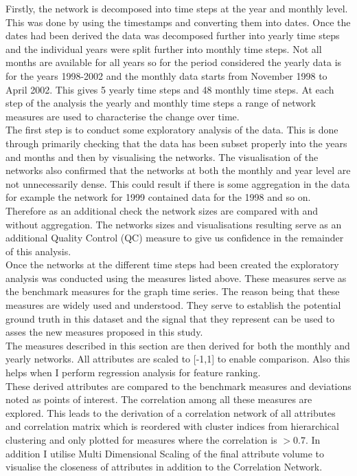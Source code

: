 Firstly, the network is decomposed into time steps at the year and monthly level. This was done by using the timestamps and converting them into dates. Once the dates had been derived the data was decomposed further into yearly time steps and the individual years were split further into monthly time steps. Not all months are available for all years so for the period considered the yearly data is for the years 1998-2002 and the monthly data starts from November 1998 to April 2002. This gives 5 yearly time steps and 48 monthly time steps. At each step of the analysis the yearly and monthly time steps a range of network measures are used to characterise the change over time. \\

The first step is to conduct some exploratory analysis of the data. This is done through primarily checking that the data has been subset properly into the years and months and then by visualising the networks. The visualisation of the networks also confirmed that the networks at both the monthly and year level are not unnecessarily dense. This could result if there is some aggregation in the data for example the network for 1999 contained data for the 1998 and so on. Therefore as an additional check the network sizes are compared with and without aggregation. The networks sizes and visualisations resulting serve as an additional Quality Control (QC) measure to give us confidence in the remainder of this analysis. \\

Once the networks at the different time steps had been created the exploratory analysis was conducted using the measures listed above. These measures serve as the benchmark measures for the graph time series. The reason being that these measures are widely used and understood. They serve to establish the potential ground truth in this dataset and the signal that they represent can be used to asses the new measures proposed in this study. \\

The measures described in this section are then derived for both the monthly and yearly networks. All attributes are scaled to [-1,1] to enable comparison. Also this helps when I perform regression analysis for feature ranking. \\

These derived attributes are compared to the benchmark measures and deviations noted as points of interest. The correlation among all these measures are explored. This leads to the derivation of a correlation network of all attributes and correlation matrix which is reordered with cluster indices from hierarchical clustering and only plotted for measures where the correlation is $> 0.7$. In addition I utilise Multi Dimensional Scaling of the final attribute volume to  visualise the closeness of attributes in addition to the Correlation Network.\\

